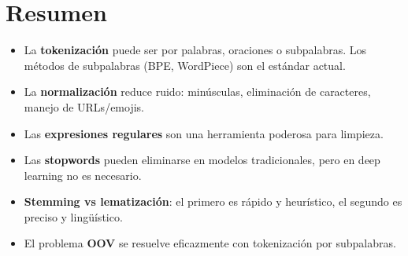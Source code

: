 \documentclass[12pt,a4paper,openany,oneside]{book}
\begin{document}
\section{Resumen}
\begin{itemize}
    \item La \textbf{tokenización} puede ser por palabras, oraciones o subpalabras. Los métodos de subpalabras (BPE, WordPiece) son el estándar actual.
    \item La \textbf{normalización} reduce ruido: minúsculas, eliminación de caracteres, manejo de URLs/emojis.
    \item Las \textbf{expresiones regulares} son una herramienta poderosa para limpieza.
    \item Las \textbf{stopwords} pueden eliminarse en modelos tradicionales, pero en deep learning no es necesario.
    \item \textbf{Stemming vs lematización}: el primero es rápido y heurístico, el segundo es preciso y lingüístico.
    \item El problema \textbf{OOV} se resuelve eficazmente con tokenización por subpalabras.
\end{itemize}
\end{document}
